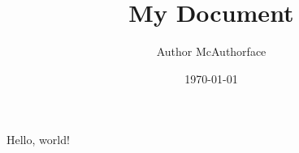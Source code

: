 \documentclass[11pt]{article}
\title{My Document}
\author{Author McAuthorface}
\date{\today}
\begin{document}
\maketitle

Hello, world!
\end{document}
